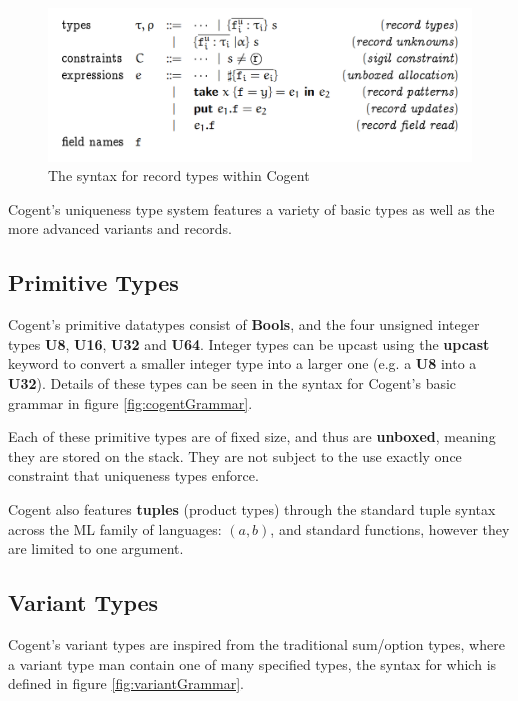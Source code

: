 \begin{figure}
    \centering
    \includegraphics[width=400pt]{content/RecordGrammar.png}
    \caption{The syntax for record types within Cogent~\citep{ICFPCogent}}
    \label{fig:recordGrammar}
\end{figure}



Cogent's uniqueness type system features a variety of basic types as well as the more advanced variants
and records.

\subsection{Primitive Types}

Cogent's primitive datatypes consist of \textbf{Bools}, and the four unsigned integer types \textbf{U8}, 
\textbf{U16}, \textbf{U32} and \textbf{U64}. Integer types can be upcast using the \textbf{upcast}
keyword to convert a smaller integer type into a larger one (e.g. a \textbf{U8} into a \textbf{U32}).
Details of these types can be seen in the syntax for Cogent's basic grammar in figure \ref{fig:cogentGrammar}.

Each of these primitive types are of fixed size, and thus are \textbf{unboxed}, meaning they are stored on the
stack. They are not subject to the use exactly once constraint that uniqueness types enforce.

Cogent also features \textbf{tuples} (product types) through the standard tuple syntax across the ML
family of languages: $(a,b)$, and standard functions, however they are limited to one argument.

\subsection{Variant Types}

Cogent's variant types are inspired from the traditional sum/option types, where a variant type man contain
one of many specified types, the syntax for which is defined in figure \ref{fig:variantGrammar}.

